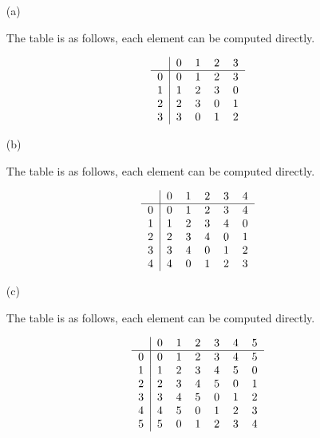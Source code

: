\documentclass[12pt]{article}
\numberwithin{theorem}{section}
\numberwithin{equation}{section}
\numberwithin{remark}{section}
\numberwithin{definition}{section}
\numberwithin{theorem}{section}
\numberwithin{lemma}{section}
\numberwithin{example}{section}
\begin{document}
\begin{itemize}
	\item[(a)]{The table is as follows, each element can be computed directly.

\begin{align*}
	\begin{tabular}{c|cccc}
		& 0 & 1 & 2 & 3 \\
		\hline
		0 & 0 & 1 & 2 & 3 \\
		1 & 1 & 2 & 3 & 0 \\
		2 & 2 & 3 & 0 & 1 \\
		3 & 3 & 0 & 1 & 2 \\
	\end{tabular}
\end{align*}
	
}
	\item[(b)]{The table is as follows, each element can be computed directly.

\begin{align*}
	\begin{tabular}{c|ccccc}
		& 0 & 1 & 2 & 3 & 4\\
		\hline
		0 & 0 & 1 & 2 & 3 & 4\\
		1 & 1 & 2 & 3 & 4 & 0\\
		2 & 2 & 3 & 4 & 0 & 1\\
		3 & 3 & 4 & 0 & 1 & 2\\
		4 & 4 & 0 & 1 & 2 & 3\\
	\end{tabular}	
\end{align*}
	
}
	\item[(c)]{The table is as follows, each element can be computed directly.

\begin{align*}
	\begin{tabular}{c|cccccc}
		& 0 & 1 & 2 & 3 & 4 & 5\\
		\hline
		0 & 0 & 1 & 2 & 3 & 4 & 5\\
		1 & 1 & 2 & 3 & 4 & 5 & 0\\
		2 & 2 & 3 & 4 & 5 & 0 & 1\\
		3 & 3 & 4 & 5 & 0 & 1 & 2\\
		4 & 4 & 5 & 0 & 1 & 2 & 3\\
		5 & 5 & 0 & 1 & 2 & 3 & 4\\
	\end{tabular}
\end{align*}

	
}
\end{itemize}
\end{document}
